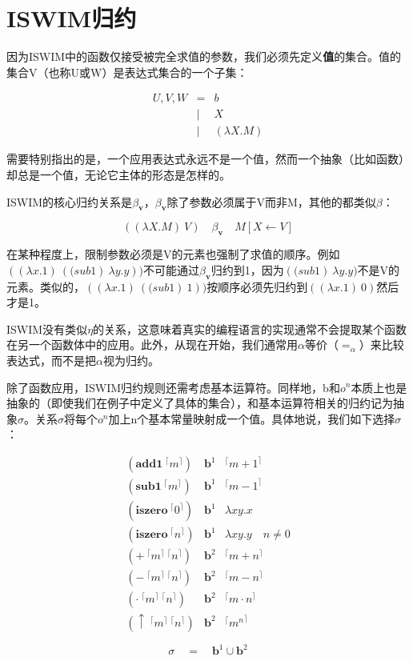 \documentclass{book}
\def\v{\mathbf{v}}
\begin{document}
\section{ISWIM归约}
因为ISWIM中的函数仅接受被完全求值的参数，我们必须先定义\textbf{值}的集合。值的集合V（也称U或W）是表达式集合的一个子集：
\begin{framed}
 $$
 \begin{array}{lcl}
  U,V,W & = & b\\
  & | & X \\
  & | & (\lambda X.M)
 \end{array}
 $$
\end{framed}
需要特别指出的是，一个应用表达式永远不是一个值，然而一个抽象（比如函数）却总是一个值，无论它主体的形态是怎样的。\par
ISWIM的核心归约关系是$\beta_{\mathbf{v}}$，$\beta_\v$除了参数必须属于V而非M，其他的都类似$\beta$：
\begin{framed}
 $$
 ((\lambda X.M)\ V)\quad \beta_{\mathbf{v}}\quad M[X\leftarrow V]
 $$
\end{framed}
在某种程度上，限制参数必须是V的元素也强制了求值的顺序。例如$((\lambda x.1)\ (\mathbf(sub1)\ \lambda y.y))$不可能通过$\beta_{\mathbf{v}}$归约到1，因为$(\mathbf(sub1)\ \lambda y.y)$不是V的元素。类似的，$((\lambda x.1)\ (\mathbf(sub1)\ 1))$按顺序必须先归约到$((\lambda x.1)\ 0)$然后才是1。\par
ISWIM没有类似$\eta$的关系，这意味着真实的编程语言的实现通常不会提取某个函数在另一个函数体中的应用。此外，从现在开始，我们通常用$\alpha$等价（$=_\alpha$）来比较表达式，而不是把$\alpha$视为归约。\par
除了函数应用，ISWIM归约规则还需考虑基本运算符。同样地，b和$o^n$本质上也是抽象的（即使我们在例子中定义了具体的集合），和基本运算符相关的归约记为抽象$\sigma$。关系$\sigma$将每个$o^n$加上n个基本常量映射成一个值。具体地说，我们如下选择$\sigma$：
\begin{framed}
 $$
 \begin{array}{lcl}
  (\mathbf{add1}\ {}^\lceil m^\rceil) & \mathbf{b}^1 & {}^\lceil {m+1}^\rceil\\
  (\mathbf{sub1}\ {}^\lceil m^\rceil) & \mathbf{b}^1 & {}^\lceil {m-1}^\rceil\\
  (\mathbf{iszero}\ {}^\lceil 0^\rceil)& \mathbf{b}^1 & \lambda xy.x\\
  (\mathbf{iszero}\ {}^\lceil n^\rceil)& \mathbf{b}^1 & \lambda xy.y\quad n\neq 0\\
  (+\ {}^\lceil m^\rceil\ {}^\lceil n^\rceil) & \mathbf{b}^2 & {}^\lceil {m+n}^\rceil \\
  (-\ {}^\lceil m^\rceil\ {}^\lceil n^\rceil) & \mathbf{b}^2 & {}^\lceil {m-n}^\rceil\\
  (\cdot\ {}^\lceil m^\rceil\ {}^\lceil n^\rceil) & \mathbf{b}^2 & {}^\lceil {m\cdot n}^\rceil\\
  (\uparrow\ {}^\lceil m^\rceil\ {}^\lceil n^\rceil) & \mathbf{b}^2 & {}^\lceil {m^n}^\rceil\\\\
 \end{array}
 $$
 $$
 \sigma\quad = \quad \mathbf{b}^1\cup \mathbf{b}^2
 $$
\end{framed}
\end{document}
